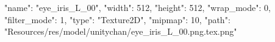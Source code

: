 {
  "name": "eye_iris_L_00",
  "width": 512,
  "height": 512,
  "wrap_mode": 0,
  "filter_mode": 1,
  "type": "Texture2D",
  "mipmap": 10,
  "path": "Resources/res/model/unitychan/eye_iris_L_00.png.tex.png"
}
